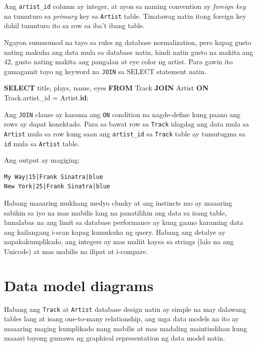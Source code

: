 \documentclass[10pt,]{book}
\newenvironment{Shaded}{}{}
\newcommand{\KeywordTok}[1]{\textcolor[rgb]{0.00,0.44,0.13}{\textbf{#1}}}
\newcommand{\NormalTok}[1]{#1}
\newcommand{\OperatorTok}[1]{\textcolor[rgb]{0.40,0.40,0.40}{#1}}
\begin{document}
 Ang \texttt{artist\_id} column ay integer, at ayon
sa naming convention ay \emph{foreign key} na tumuturo sa \emph{primary}
key sa \texttt{Artist} table. Tinatawag natin itong foreign key dahil
tumuturo ito sa row sa iba't ibang table.

  Ngayon sumusunod na tayo sa rules ng
database normalization, pero kapag gusto nating makuha ang data mula sa
database natin, hindi natin gusto na makita ang 42, gusto nating makita
ang pangalan at eye color ng artist. Para gawin ito gumagamit tayo ng
keyword na \texttt{JOIN} sa SELECT statement natin.

\begin{Shaded}
\begin{Highlighting}[]
\KeywordTok{SELECT}\NormalTok{ title, plays, name, eyes}
\KeywordTok{FROM}\NormalTok{ Track }\KeywordTok{JOIN}\NormalTok{ Artist}
\KeywordTok{ON}\NormalTok{ Track.artist\_id }\OperatorTok{=}\NormalTok{ Artist.}\KeywordTok{id}\NormalTok{;}
\end{Highlighting}
\end{Shaded}

Ang \texttt{JOIN} clause ay kasama ang \texttt{ON} condition na
nagde-define kung paano ang rows ay dapat konektado. Para sa bawat row
sa \texttt{Track} idagdag ang data mula sa \texttt{Artist} mula sa row
kung saan ang \texttt{artist\_id} sa \texttt{Track} table ay tumutugma
sa \texttt{id} mula sa \texttt{Artist} table.

Ang output ay magiging:

{\small
\begin{verbatim}
My Way|15|Frank Sinatra|blue
New York|25|Frank Sinatra|blue
\end{verbatim}
}

Habang maaaring mukhang medyo clunky at ang instincts mo ay maaaring
sabihin sa iyo na mas mabilis lang na panatilihin ang data sa isang
table, lumalabas na ang limit sa database performance ay kung gaano
karaming data ang kailangang i-scan kapag kumukuha ng query. Habang ang
detalye ay napakakumplikado, ang integers ay mas maliit kaysa sa strings
(lalo na ang Unicode) at mas mabilis na ilipat at i-compare.

\section{Data model diagrams}\label{data-model-diagrams}

  Habang
ang \texttt{Track} at \texttt{Artist} database design natin ay simple na
may dalawang tables lang at isang one-to-many relationship, ang mga data
models na ito ay maaaring maging kumplikado nang mabilis at mas madaling
maintindihan kung maaari tayong gumawa ng graphical representation ng
data model natin.
\end{document}
